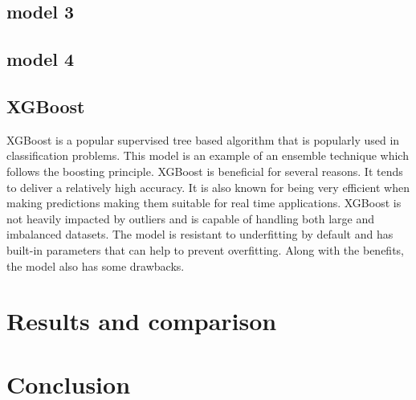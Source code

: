 \subsection{model 3}
\subsection{model 4}
\subsection{XGBoost}
XGBoost is a popular supervised tree based algorithm that is popularly used in classification problems. This model is an example of an ensemble technique which follows the boosting principle. XGBoost is beneficial for several reasons. It tends to deliver a relatively high accuracy. It is also known for being very efficient when making predictions making them suitable for real time applications. XGBoost is not heavily impacted by outliers and is capable of handling both large and imbalanced datasets. The model is resistant to underfitting by default and has built-in parameters that can help to prevent overfitting. Along with the benefits, the model also has some drawbacks. 

\section{Results and comparison}

\section{Conclusion}




